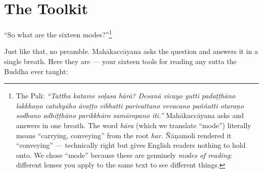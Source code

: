 \chapter{The Toolkit}
\label{ch:toolkit}

``So what are the sixteen modes?''\footnote{The Pali: \textit{``Tattha katame soḷasa hārā? Desanā vicayo yutti padaṭṭhāno lakkhaṇo catubyūho āvaṭṭo vibhatti parivattano vevacano paññatti otaraṇo sodhano adhiṭṭhāno parikkhāro samāropano iti.''} Mahākaccāyana asks and answers in one breath. The word \textit{hāra} (which we translate ``mode'') literally means ``carrying, conveying'' from the root \textit{har}. Ñāṇamoli rendered it ``conveying'' --- technically right but gives English readers nothing to hold onto. We chose ``mode'' because these are genuinely \textit{modes of reading}: different lenses you apply to the same text to see different things.}

Just like that, no preamble. Mahākaccāyana asks the question and answers it in a single breath. Here they are --- your sixteen tools for reading any sutta the Buddha ever taught:

